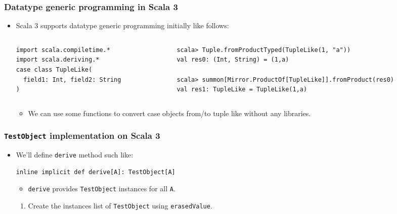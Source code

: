 \begin{frame}[fragile]
  \frametitle{Datatype generic programming in Scala 3}

  \begin{itemize}
    \item Scala 3 supports datatype generic programming initially like follows:
    \begin{columns}
      \begin{column}{0.4\textwidth}
\begin{lstlisting}[style=scala]
import scala.compiletime.*
import scala.deriving.*
case class TupleLike(
  field1: Int, field2: String
)
\end{lstlisting}
      \end{column}
      \begin{column}{0.6\textwidth}
\begin{lstlisting}[style=scala]
scala> Tuple.fromProductTyped(TupleLike(1, "a"))
val res0: (Int, String) = (1,a)

scala> summon[Mirror.ProductOf[TupleLike]].fromProduct(res0)
val res1: TupleLike = TupleLike(1,a)
\end{lstlisting}
      \end{column}
    \end{columns}
    \begin{itemize}
      \item We can use some functions to convert
      case objects from/to tuple like without any libraries.
    \end{itemize}

  \end{itemize}
\end{frame}

\begin{frame}[fragile]
  \frametitle{\lstinline|TestObject| implementation on Scala 3}

  \begin{itemize}
    \item We'll define \lstinline|derive| method such like:
\begin{lstlisting}[style=scala]
inline implicit def derive[A]: TestObject[A]
\end{lstlisting}   
    \begin{itemize}
      \item \lstinline|derive| provides \lstinline|TestObject| instances for all \lstinline|A|.
    \end{itemize}

    \begin{enumerate}
      \item Create the instances list of \lstinline|TestObject| using \lstinline|erasedValue|.
    \end{enumerate}
  \end{itemize}
\end{frame}


